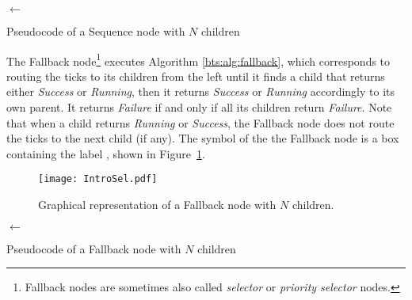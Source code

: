 \begin{algorithm2e}[h]
  {
     $\gets$ \\
    {
    }
    {
    }
  }
  \caption{Pseudocode of a Sequence node with $N$ children}
  \label{bts:alg:sequence}
\end{algorithm2e}


The Fallback node\footnote{Fallback nodes are sometimes also called \emph{selector} or \emph{priority selector} nodes.} executes Algorithm \ref{bts:alg:fallback},
which corresponds to routing the ticks to its children from the left until it finds a child that returns either \emph{Success} or \emph{Running}, then it returns \emph{Success} or \emph{Running} accordingly to its own parent. It returns \emph{Failure} if and only if all its children return \emph{Failure}. Note that when a child returns \emph{Running} or \emph{Success}, the Fallback node does not route the ticks to the next child (if any).
The symbol of the the Fallback node is a box containing the label , shown in Figure~\ref{bts.fig.sel}.
\begin{figure}[h]
\centering
\texttt{[image: IntroSel.pdf]}
\caption{Graphical representation of a Fallback node with $N$ children.}
\label{bts.fig.sel}
\end{figure}

\begin{algorithm2e}[h]
  {
     $\gets$ \\
    {
    }
    {
    }
  }
  \caption{Pseudocode of a Fallback node with $N$ children}
    \label{bts:alg:fallback}
\end{algorithm2e}


